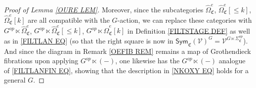 \documentclass[a4paper,10pt
,draft
]{article}%
\numberwithin{equation}{section}
\numberwithin{figure}{section}
\theoremstyle{definition} %
\newcommand{\V}{\ensuremath{\mathcal V}}
\newcommand{\1}{\ensuremath{\mathbbm 1}}%
\begin{document}
\begin{proof}[Proof of Lemma \ref{OURE LEM}]
Moreover, since the subcategories 
$\widehat{\Omega}_{\mathfrak{C}}^e$,
$\widehat{\Omega}_{\mathfrak{C}}^e[\leq k]$,
$\widehat{\Omega}_{\mathfrak{C}}^e[k]$
are all compatible with the $G$-action, we can replace these categories with 
$G^{op} \ltimes \widehat{\Omega}_{\mathfrak{C}}^e$,
$G^{op} \ltimes \widehat{\Omega}_{\mathfrak{C}}^e[\leq k]$,
$G^{op} \ltimes \widehat{\Omega}_{\mathfrak{C}}^e[k]$
in Definition \ref{FILTSTAGE DEF}
as well as in \eqref{FILTLAN EQ}
(so that the right square is now in 
$\mathsf{Sym}_{\mathfrak{C}}(\mathcal{V})^G = \V^{G \ltimes \Sigma^{op}_{\mathfrak{C}}}$).
And since the diagram in Remark \ref{OEFIB REM}
remains a map of Grothendieck fibrations 
upon applying $G^{op} \ltimes (-)$,
one likewise has the $G^{op} \ltimes (-)$ analogue of
\eqref{FILTLANFIN EQ},
showing that the description in 
\eqref{NKOXY EQ} holds for a general $G$.
\end{proof}
\end{document}
